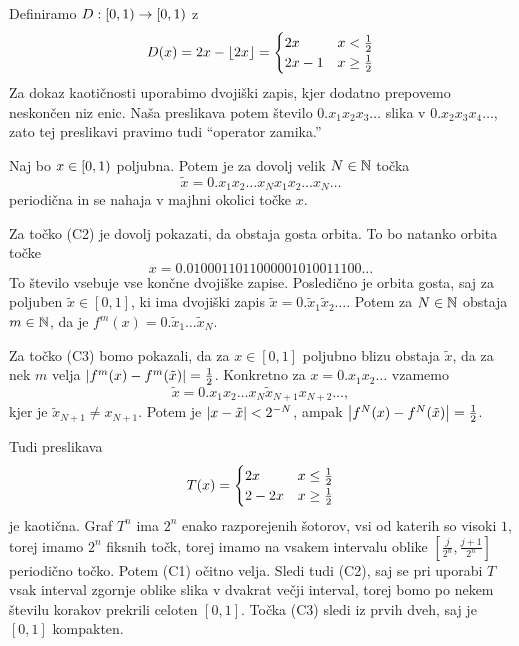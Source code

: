 \begin{primer}
  Definiramo $D: \left[0,1\right) \to \left[0,1\right)$ z
  \[
	D(x) = 2x - \lfloor 2x \rfloor
	=
	\begin{cases}
	  2x & x < \frac{1}{2} \\
	  2x-1 & x \ge \frac{1}{2}
	\end{cases}
  \]
  Za dokaz kaotičnosti uporabimo dvojiški zapis, kjer dodatno prepovemo
  neskončen niz enic.
  Naša preslikava potem število $0.x_1 x_2 x_3 \ldots$ slika v $0.x_2 x_3 x_4
  \ldots$, zato tej preslikavi pravimo tudi \enquote{operator zamika.}

  Naj bo $x \in \left[0,1\right)$ poljubna.
  Potem je za dovolj velik $N \in \mathbb{N}$ točka
  \[
	\tilde{x} = 0. x_1 x_2 \ldots x_N x_1 x_2 \ldots x_N \ldots
  \]
  periodična in se nahaja v majhni okolici točke $x$.

  Za točko (C2) je dovolj pokazati, da obstaja gosta orbita.
  To bo natanko orbita točke
  \[
	x = 0.0100011011000001010011100\ldots
  \]
  To število vsebuje vse končne dvojiške zapise.
  Posledično je orbita gosta, saj za poljuben $\tilde{x} \in [0,1]$, ki ima
  dvojiški zapis $\tilde{x} = 0.\tilde{x}_1 \tilde{x}_2 \ldots$.
  Potem za $N \in \mathbb{N}$ obstaja $m \in \mathbb{N}$, da je $f^m(x) = 0.\tilde{x}_1 \ldots
  \tilde{x}_N$.

  Za točko (C3) bomo pokazali, da za $x \in [0,1]$ poljubno blizu obstaja
  $\tilde{x}$, da za nek $m$ velja $\left| f^m(x) - f^m(\tilde{x}) \right| = \frac{1}{2}$.
  Konkretno za $x = 0.x_1 x_2 \ldots$ vzamemo
  \[
	\tilde{x} = 0.x_1 x_2 \ldots x_N \tilde{x}_{N+1} x_{N+2} \ldots,
  \]
  kjer je $\tilde{x}_{N+1} \ne x_{N+1}$.
  Potem je $\left| x - \tilde{x} \right| < 2^{-N}$, ampak $\left| f^N(x) -
	f^{N}(\tilde{x}) \right| = \frac{1}{2}$.
  \boxdot{}
\end{primer}

\begin{primer}
  Tudi preslikava
  \[
	T(x) =
	\begin{cases}
	  2x & x \le \frac{1}{2} \\
	  2 - 2x & x \ge \frac{1}{2}
	\end{cases}
  \]
  je kaotična.
  Graf $T^n$ ima $2^n$ enako razporejenih šotorov, vsi od katerih so visoki
  $1$, torej imamo $2^n$ fiksnih točk, torej imamo na vsakem intervalu oblike
  $[\frac{j}{2^n}, \frac{j+1}{2^n}]$ periodično točko.
  Potem (C1) očitno velja.
  Sledi tudi (C2), saj se pri uporabi $T$ vsak interval zgornje oblike slika v
  dvakrat večji interval, torej bomo po nekem številu korakov prekrili celoten
  $[0,1]$.
  Točka (C3) sledi iz prvih dveh, saj je $[0,1]$ kompakten.
\end{primer}

